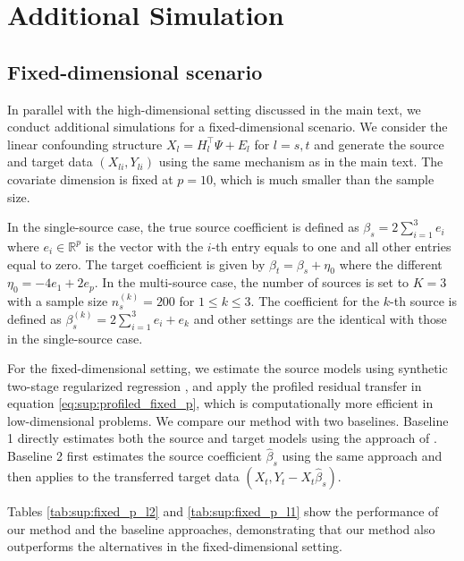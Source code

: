 \documentclass[12pt]{article}
\begin{document}
\section{Additional Simulation}

\subsection{Fixed-dimensional scenario}
In parallel with the high-dimensional setting discussed in the main text, we conduct additional simulations for a fixed-dimensional scenario. We consider the linear confounding structure $X_l = H_l^\top \Psi + E_l$ for $l=s,t$ and generate the source and target data $(X_{li},Y_{li})$ using the same mechanism as in the main text. The covariate dimension is fixed at $p=10$, which is much smaller than the sample size. 

In the single-source case, the true source coefficient is defined as $\beta_s = 2\sum_{i=1}^3 e_i$ where $e_i \in \mathbb{R}^p$ is the vector with the $i$-th entry equals to one and all other entries equal to zero. The target coefficient is given by $\beta_t = \beta_s + \eta_0$ where the different $\eta_0 = -4e_1 + 2e_p$.  In the multi-source case, the number of sources is set to $K=3$ with a  sample size $n_s^{(k)} = 200$ for $1\le k\le 3$. The coefficient for the $k$-th source is defined as $\beta_s^{(k)} = 2\sum_{i=1}^3 e_i + e_k$ and other settings are the identical with those in the single-source case. 

For the fixed-dimensional setting, we estimate the source models using synthetic two-stage regularized regression \citep{tang2023synthetic}, and apply the profiled residual transfer in equation \eqref{eq:sup:profiled_fixed_p}, which is computationally more efficient in low-dimensional problems. We compare our method with two baselines. Baseline 1 directly estimates both the source and target models using the approach of \cite{tang2023synthetic}. Baseline 2 first estimates the source coefficient $\hat{\beta}_s$ using the same approach and then applies \cite{tang2023synthetic} to the transferred target data $(X_t,Y_t-X_t\hat{\beta}_s)$. 

Tables \ref{tab:sup:fixed_p_l2} and \ref{tab:sup:fixed_p_l1} show the performance of our method and the baseline approaches, demonstrating that our method also outperforms the alternatives in the fixed-dimensional setting.
\end{document}
